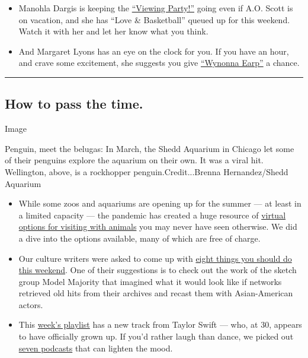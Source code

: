 \begin{itemize}
\item
  Manohla Dargis is keeping the
  \href{https://www.nytimes.com/2020/07/23/movies/love-basketball-sanaa-lathan-omar-epps.html}{``Viewing
  Party!''} going even if A.O. Scott is on vacation, and she has ``Love
  \& Basketball'' queued up for this weekend. Watch it with her and let
  her know what you think.
\item
  And Margaret Lyons has an eye on the clock for you. If you have an
  hour, and crave some excitement, she suggests you give
  \href{https://www.nytimes.com/2020/07/23/arts/television/Wynonna-Earp-hannibal-meerkat-manor.html}{``Wynonna
  Earp''} a chance.
\end{itemize}

\begin{center}\rule{0.5\linewidth}{\linethickness}\end{center}

\hypertarget{how-to-pass-the-time}{%
\subsection{How to pass the time.}\label{how-to-pass-the-time}}

Image

Penguin, meet the belugas: In March, the Shedd Aquarium in Chicago let
some of their penguins explore the aquarium on their own. It was a viral
hit. Wellington, above, is a rockhopper penguin.Credit...Brenna
Hernandez/Shedd Aquarium

\begin{itemize}
\item
  While some zoos and aquariums are opening up for the summer --- at
  least in a limited capacity --- the pandemic has created a huge
  resource of
  \href{https://www.nytimes.com/2020/07/23/arts/design/zoos-aquariums-virtual-virus.html}{virtual
  options for visiting with animals} you may never have seen otherwise.
  We did a dive into the options available, many of which are free of
  charge.
\item
  Our culture writers were asked to come up with
  \href{https://www.nytimes.com/2020/07/23/arts/things-to-do-weekend-coronavirus.html}{eight
  things you should do this weekend}. One of their suggestions is to
  check out the work of the sketch group Model Majority that imagined
  what it would look like if networks retrieved old hits from their
  archives and recast them with Asian-American actors.
\item
  This
  \href{https://www.nytimes.com/2020/07/24/arts/music/playlist-taylor-swift-j-cole-drake.html}{week's
  playlist} has a new track from Taylor Swift --- who, at 30, appears to
  have officially grown up. If you'd rather laugh than dance, we picked
  out
  \href{https://www.nytimes.com/2020/07/22/arts/comedy-funny-podcasts.html}{seven
  podcasts} that can lighten the mood.
\end{itemize}


